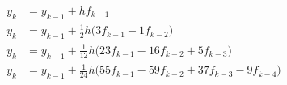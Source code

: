 \begin{align*}
  y_k &= y_{k-1} + h f_{k-1} \\
  y_k &= y_{k-1} + \frac12h
        \bigl( 3f_{k-1} -1f_{k-2}\bigr)\\
  y_k &= y_{k-1} +
        \frac1{12}h \bigl( 23f_{k-1} -16 f_{k-2} +5f_{k-3}\bigr)\\
  y_k &= y_{k-1} +
        \frac1{24}h \bigl(55f_{k-1} -59 f_{k-2}+ 37f_{k-3} -9f_{k-4}\bigr)
\end{align*}

